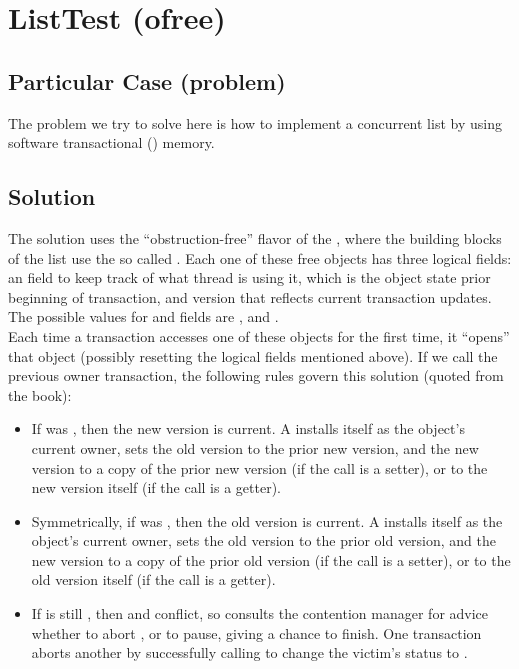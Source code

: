 \section{\textbf{ListTest (ofree)}}

\subsection{Particular Case (problem)}
The problem we try to solve here is how to implement a concurrent list
by using software transactional () memory.

\subsection{Solution}
The solution uses the ``obstruction-free'' flavor of the , where
the building blocks of the list use the so called . Each
one of these free objects has three logical fields: an  field
to keep track of what thread is using it,  which is the
object state prior beginning of transaction, and 
version that reflects current transaction updates. The possible values
for  and  fields are ,
 and . \\ 

Each time a transaction  accesses one of these objects for the
first time, it ``opens'' that object (possibly resetting the logical
fields mentioned above). If we call  the previous owner
transaction, the following rules govern this solution (quoted from the
book): \\

\begin{itemize}
  \item If  was , then the new version is current. A
installs itself as the object's current owner, sets the old version to
the prior new version, and the new version to a copy of the prior new
version (if the call is a setter), or to the new version itself (if
the call is a getter). \\  

 \item Symmetrically, if  was , then the old version is 
current. A installs itself as the object’s current owner, sets the old
version to the prior old version, and the new version to a copy of the
prior old version (if the call is a setter), or to the old version
itself (if the call is a getter).  \\

  \item If  is still , then  and  conflict, so 
 consults the contention manager for advice whether to abort
, or to pause, giving  a chance to finish. One transaction
aborts another by successfully calling  to change the
victim's status to . 
\end{itemize}
\hfill

